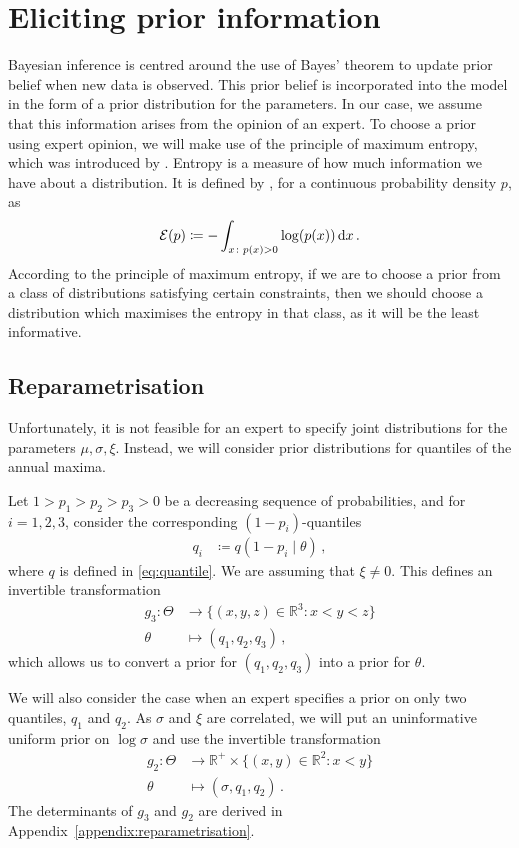 \documentclass{article}
\newcommand{\R}{\mathbb{R}}
\newcommand{\dd}{{\rm d}}
\begin{document}
\section{Eliciting prior information}
\label{section:priors}
%
Bayesian inference is centred around the use of Bayes' theorem
to update prior belief when new data is observed.
This prior belief is incorporated
into the model in the form of a prior distribution for the parameters.
In our case, we assume that this information
arises from the opinion of an expert.
To choose a prior using expert opinion, we will make use of
the principle of maximum entropy,
which was introduced by \cite{jaynes1957}.
Entropy is a measure of how much information we have about a distribution.
It is defined by \cite{shannon1948},
for a continuous probability density $p$, as
%
\begin{align*}
	{\cal E}(p) \coloneqq -\int_{x \colon p(x) > 0} \log(p(x)) \, \dd x \,.
\end{align*}
%
According to the principle of maximum entropy,
if we are to choose a prior from a class of distributions satisfying
certain constraints,
then we should choose a distribution which
maximises the entropy in that class,
as it will be the least informative.
%
\subsection{Reparametrisation}
%
Unfortunately, it is not feasible for an
expert to specify joint distributions
for the parameters $\mu, \sigma, \xi$.
Instead, we will consider prior distributions
for quantiles of the annual maxima.
%

%
Let $1 > p_1 > p_2 > p_3 > 0$ be a decreasing sequence of probabilities,
and for $i = 1, 2, 3$, consider the corresponding $(1 - p_i)$-quantiles
%
\begin{align*}
	q_i &\coloneqq q(1 - p_i \mid \theta) \,,
\end{align*}
%
where $q$ is defined in \eqref{eq:quantile}.
We are assuming that $\xi \neq 0$.
This defines an invertible transformation
%
\begin{align*}
	g_3 \colon \Theta &\to \{(x, y, z) \in \R^3 \colon x < y < z\} \\
	\theta &\mapsto (q_{1}, q_{2}, q_{3}) \,,
\end{align*}
%
which allows us to convert a prior for $(q_1, q_2, q_3)$
into a prior for $\theta$.
%

%
We will also consider the case when an expert specifies a prior
on only two quantiles, $q_1$ and $q_2$.
As $\sigma$ and $\xi$ are correlated,
we will put an uninformative uniform prior on $\log \sigma$
and use the invertible transformation
%
\begin{align*}
	g_2 \colon \Theta &\to \R^+ \times \{(x, y) \in \R^2 \colon x < y\} \\
	\theta &\mapsto (\sigma, q_{1}, q_{2}) \,.
\end{align*}
%
The determinants of $g_3$ and $g_2$ are derived in
Appendix~\ref{appendix:reparametrisation}.
%
\end{document}
